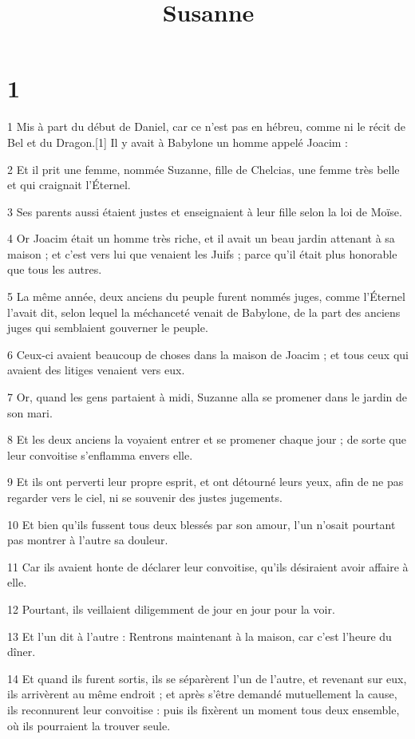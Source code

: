 

\title{Susanne}


\chapter{1}

\par 1 Mis à part du début de Daniel, car ce n'est pas en hébreu, comme ni le récit de Bel et du Dragon.[1] Il y avait à Babylone un homme appelé Joacim :
\par 2 Et il prit une femme, nommée Suzanne, fille de Chelcias, une femme très belle et qui craignait l'Éternel.
\par 3 Ses parents aussi étaient justes et enseignaient à leur fille selon la loi de Moïse.
\par 4 Or Joacim était un homme très riche, et il avait un beau jardin attenant à sa maison ; et c'est vers lui que venaient les Juifs ; parce qu'il était plus honorable que tous les autres.
\par 5 La même année, deux anciens du peuple furent nommés juges, comme l'Éternel l'avait dit, selon lequel la méchanceté venait de Babylone, de la part des anciens juges qui semblaient gouverner le peuple.
\par 6 Ceux-ci avaient beaucoup de choses dans la maison de Joacim ; et tous ceux qui avaient des litiges venaient vers eux.
\par 7 Or, quand les gens partaient à midi, Suzanne alla se promener dans le jardin de son mari.
\par 8 Et les deux anciens la voyaient entrer et se promener chaque jour ; de sorte que leur convoitise s'enflamma envers elle.
\par 9 Et ils ont perverti leur propre esprit, et ont détourné leurs yeux, afin de ne pas regarder vers le ciel, ni se souvenir des justes jugements.
\par 10 Et bien qu'ils fussent tous deux blessés par son amour, l'un n'osait pourtant pas montrer à l'autre sa douleur.
\par 11 Car ils avaient honte de déclarer leur convoitise, qu'ils désiraient avoir affaire à elle.
\par 12 Pourtant, ils veillaient diligemment de jour en jour pour la voir.
\par 13 Et l'un dit à l'autre : Rentrons maintenant à la maison, car c'est l'heure du dîner.
\par 14 Et quand ils furent sortis, ils se séparèrent l'un de l'autre, et revenant sur eux, ils arrivèrent au même endroit ; et après s'être demandé mutuellement la cause, ils reconnurent leur convoitise : puis ils fixèrent un moment tous deux ensemble, où ils pourraient la trouver seule.
